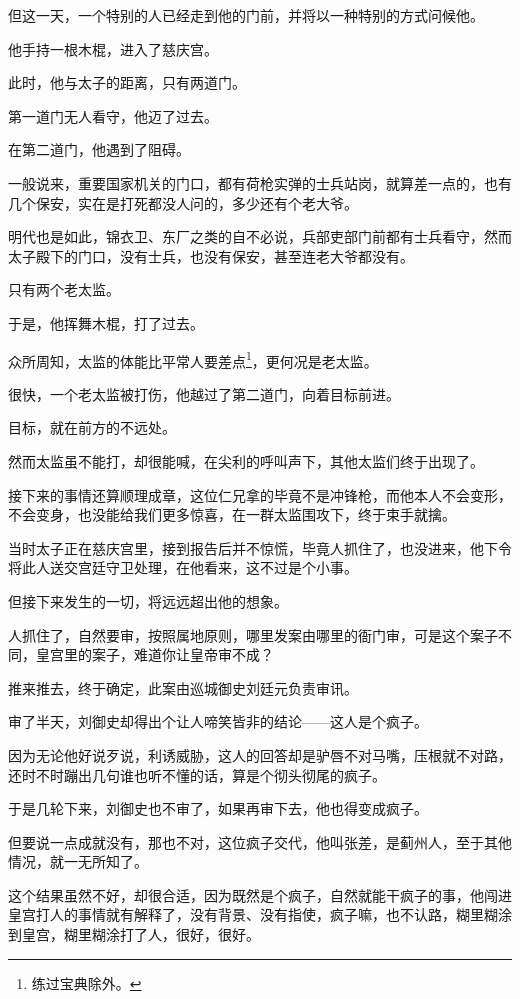 \begin{multicols}{\theparacolNo}
但这一天，一个特别的人已经走到他的门前，并将以一种特别的方式问候他。

他手持一根木棍，进入了慈庆宫。

此时，他与太子的距离，只有两道门。

第一道门无人看守，他迈了过去。

在第二道门，他遇到了阻碍。

一般说来，重要国家机关的门口，都有荷枪实弹的士兵站岗，就算差一点的，也有几个保安，实在是打死都没人问的，多少还有个老大爷。

明代也是如此，锦衣卫、东厂之类的自不必说，兵部吏部门前都有士兵看守，然而太子殿下的门口，没有士兵，也没有保安，甚至连老大爷都没有。

只有两个老太监。

于是，他挥舞木棍，打了过去。

众所周知，太监的体能比平常人要差点\footnote{练过宝典除外。}，更何况是老太监。

很快，一个老太监被打伤，他越过了第二道门，向着目标前进。

目标，就在前方的不远处。

然而太监虽不能打，却很能喊，在尖利的呼叫声下，其他太监们终于出现了。

接下来的事情还算顺理成章，这位仁兄拿的毕竟不是冲锋枪，而他本人不会变形，不会变身，也没能给我们更多惊喜，在一群太监围攻下，终于束手就擒。

当时太子正在慈庆宫里，接到报告后并不惊慌，毕竟人抓住了，也没进来，他下令将此人送交宫廷守卫处理，在他看来，这不过是个小事。

但接下来发生的一切，将远远超出他的想象。

人抓住了，自然要审，按照属地原则，哪里发案由哪里的衙门审，可是这个案子不同，皇宫里的案子，难道你让皇帝审不成？

推来推去，终于确定，此案由巡城御史刘廷元负责审讯。

审了半天，刘御史却得出个让人啼笑皆非的结论——这人是个疯子。

因为无论他好说歹说，利诱威胁，这人的回答却是驴唇不对马嘴，压根就不对路，还时不时蹦出几句谁也听不懂的话，算是个彻头彻尾的疯子。

于是几轮下来，刘御史也不审了，如果再审下去，他也得变成疯子。

但要说一点成就没有，那也不对，这位疯子交代，他叫张差，是蓟州人，至于其他情况，就一无所知了。

这个结果虽然不好，却很合适，因为既然是个疯子，自然就能干疯子的事，他闯进皇宫打人的事情就有解释了，没有背景、没有指使，疯子嘛，也不认路，糊里糊涂到皇宫，糊里糊涂打了人，很好，很好。


\end{multicols}
